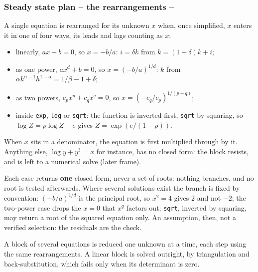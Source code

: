 \documentclass[10pt,slidestop]{beamer}
\theoremstyle{plain}
\begin{document}
\begin{frame}[fragile]
  \frametitle{Steady state plan -- the rearrangements --}

  A single equation is rearranged for its unknown $x$ when, once simplified, $x$
  enters it in one of four ways, its leads and lags counting as $x$:
  \begin{itemize}\small
  \item linearly, $a x + b = 0$, so $x = -b/a$: $i = \delta k$ from
    $k = (1-\delta)k + i$;
  \item as one power, $a x^d + b = 0$, so $x = (-b/a)^{1/d}$: $k$ from
    $\alpha k^{\alpha-1} h^{1-\alpha} = 1/\beta - 1 + \delta$;
  \item as two powers, $c_p x^p + c_q x^q = 0$, so $x = (-c_q/c_p)^{1/(p-q)}$;
  \item inside \verb+exp+, \verb+log+ or \verb+sqrt+: the function is inverted
    first, \verb+sqrt+ by squaring, so $\log Z = \rho \log Z + e$ gives
    $Z = \exp\left(e/(1-\rho)\right)$.
  \end{itemize}

  \small When $x$ sits in a denominator, the equation is first multiplied through by
  it. Anything else, $\log y + y^3 = x$ for instance, has no closed form: the block
  resists, and is left to a numerical solve (later frame).

  \medskip
  Each case returns \textbf{one} closed form, never a set of roots: nothing branches, and no
  root is tested afterwards. Where several solutions exist the branch is fixed by convention:
  $(-b/a)^{1/d}$ is the principal root, so $x^2 = 4$ gives $2$ and not $-2$; the two-power case
  drops the $x = 0$ that $x^q$ factors out; \verb+sqrt+, inverted by squaring, may return a root
  of the squared equation only. An assumption, then, not a verified selection: the residuals are
  the check.

  \medskip
  A block of several equations is reduced one unknown at a time, each step using
  the same rearrangements. A linear block is solved outright, by triangulation and
  back-substitution, which fails only when its determinant is zero.

\end{frame}
\end{document}
